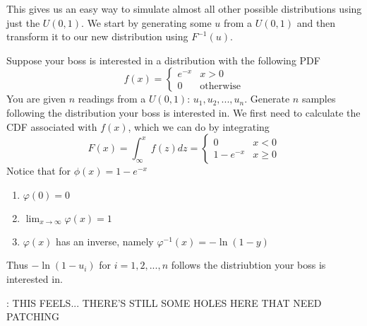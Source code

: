 \documentclass{report}
\begin{document}
This gives us an easy way to simulate almost all other possible distributions using just the $U(0,1)$. We start by generating some $u$ from a $U(0,1)$ and then transform it to our new distribution using $F^{-1}(u)$.
\begin{example}
    Suppose your boss is interested in a distribution with the following PDF
    \[
        f(x)=\begin{cases}
            e^{-x} & x> 0
            \\
            0 & \text{otherwise}
            \end{cases}
    \]
    You are given $n$ readings from a $U(0,1)$: $u_1, u_2,...,u_n$. Generate $n$ samples following the distribution your boss is interested in.
    \solution
    We first need to calculate the CDF associated with $f(x)$, which we can do by integrating
    \[
        F(x)=\int_{\infty}^x f(z)dz = \begin{cases}
            0 & x < 0
            \\
            1-e^{-x}& x\ge 0
        \end{cases}
    \]
    Notice that for $\phi(x)=1-e^{-x}$
    \begin{enumerate}
        \item $\varphi(0)=0$
        \item $\displaystyle\lim_{x\to\infty}\varphi(x)=1$
        \item $\varphi(x)$ has an inverse, namely $\varphi^{-1}(x)=-\ln(1-y)$
    \end{enumerate}
    Thus $-\ln(1-u_i)$ for $i=1,2,...,n$ follows the distriubtion your boss is interested in.
\end{example}
\todo: THIS FEELS... THERE'S STILL SOME HOLES HERE THAT NEED PATCHING
\end{document}
